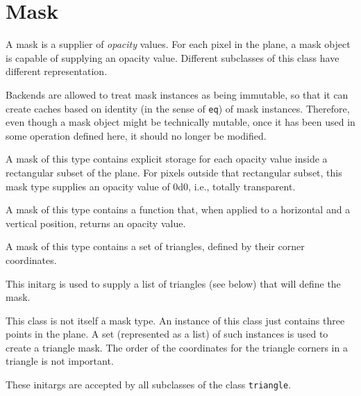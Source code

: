 \chapter{Mask}


A mask is a supplier of \emph{opacity} values.  For each pixel in the
plane, a mask object is capable of supplying an opacity value.
Different subclasses of this class have different representation.

Backends are allowed to treat mask instances as being immutable, so
that it can create caches based on identity (in the sense of
\texttt{eq}) of mask instances.  Therefore, even though a mask object
might be technically mutable, once it has been used in some operation
defined here, it should no longer be modified.


A mask of this type contains explicit storage for each opacity value
inside a rectangular subset of the plane.  For pixels outside that
rectangular subset, this mask type supplies an opacity value of 0d0,
i.e., totally transparent.


A mask of this type contains a function that, when applied to a
horizontal and a vertical position, returns an opacity value.


A mask of this type contains a set of triangles, defined by their
corner coordinates.


This initarg is used to supply a list of triangles (see below) that
will define the mask.


This class is not itself a mask type.  An instance of this class just
contains three points in the plane.  A set (represented as a list) of
such instances is used to create a triangle mask.  The order of the
coordinates for the triangle corners in a triangle is not important.


These initargs are accepted by all subclasses of the class
\texttt{triangle}.
